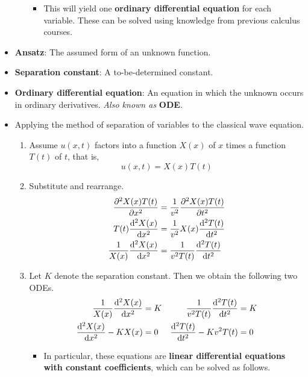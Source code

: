 \documentclass[../notes.tex]{subfiles}
\begin{document}
\begin{itemize}
\begin{enumerate}
\begin{itemize}
            \item This will yield one \textbf{ordinary differential equation} for each variable. These can be solved using knowledge from previous calculus courses.
        \end{itemize}
    \end{enumerate}
    \item \textbf{Ansatz}: The assumed form of an unknown function.
    \item \textbf{Separation constant}: A to-be-determined constant.
    \item \textbf{Ordinary differential equation}: An equation in which the unknown occurs in ordinary derivatives. \emph{Also known as} \textbf{ODE}.
    \item Applying the method of separation of variables to the classical wave equation.
    \begin{enumerate}
        \item Assume $u(x,t)$ factors into a function $X(x)$ of $x$ times a function $T(t)$ of $t$, that is,
        \begin{equation*}
            u(x,t) = X(x)T(t)
        \end{equation*}
        \item Substitute and rearrange.
        \begin{align*}
            \pdv[2]{X(x)T(t)}{x} &= \frac{1}{v^2}\pdv[2]{X(x)T(t)}{t}\\
            T(t)\dv[2]{X(x)}{x} &= \frac{1}{v^2}X(x)\dv[2]{T(t)}{t}\\
            \frac{1}{X(x)}\dv[2]{X(x)}{x} &= \frac{1}{v^2T(t)}\dv[2]{T(t)}{t}
        \end{align*}
        \item Let $K$ denote the separation constant. Then we obtain the following two ODEs.
        \begin{align*}
            \frac{1}{X(x)}\dv[2]{X(x)}{x} &= K&
                \frac{1}{v^2T(t)}\dv[2]{T(t)}{t} &= K\\
            \dv[2]{X(x)}{x}-KX(x) &= 0&
                \dv[2]{T(t)}{t}-Kv^2T(t) &= 0\\
        \end{align*}
        \begin{itemize}
            \item In particular, these equations are \textbf{linear differential equations with constant coefficients}, which can be solved as follows.
        \end{itemize}
    \end{enumerate}

\end{itemize}
\end{document}
